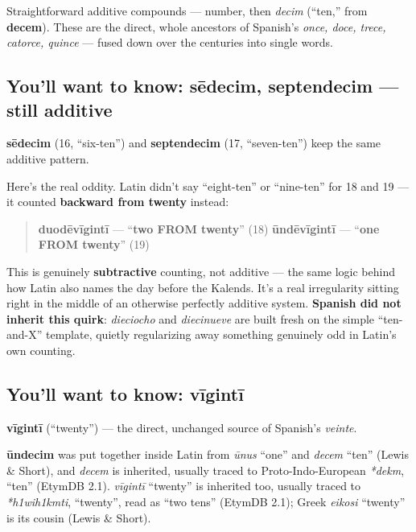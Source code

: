 Straightforward additive compounds — number, then \emph{decim} (\textquotedblleft{}ten,\textquotedblright{} from \textbf{decem}). These are the direct, whole ancestors of Spanish's \emph{once, doce, trece, catorce, quince} — fused down over the centuries into single words.

\subsection*{You'll want to know: sēdecim, septendecim — still additive}
\textbf{sēdecim} (16, \textquotedblleft{}six-ten\textquotedblright{}) and \textbf{septendecim} (17, \textquotedblleft{}seven-ten\textquotedblright{}) keep the same additive pattern.

\begin{culture}
Here's the real oddity. Latin didn't say \textquotedblleft{}eight-ten\textquotedblright{} or \textquotedblleft{}nine-ten\textquotedblright{} for 18 and 19 — it counted \textbf{backward from twenty} instead:

\begin{quote}
\textbf{duodēvīgintī} — \textquotedblleft{}\textbf{two FROM twenty}\textquotedblright{} (18) \textbf{ūndēvīgintī} — \textquotedblleft{}\textbf{one FROM twenty}\textquotedblright{} (19)
\end{quote}

This is genuinely \textbf{subtractive} counting, not additive — the same logic behind how Latin also names the day before the Kalends. It's a real irregularity sitting right in the middle of an otherwise perfectly additive system. \textbf{Spanish did not inherit this quirk}: \emph{dieciocho} and \emph{diecinueve} are built fresh on the simple \textquotedblleft{}ten-and-X\textquotedblright{} template, quietly regularizing away something genuinely odd in Latin's own counting.
\end{culture}

\subsection*{You'll want to know: vīgintī}
\textbf{vīgintī} (\textquotedblleft{}twenty\textquotedblright{}) — the direct, unchanged source of Spanish's \emph{veinte}.

\begin{cousinweb}
\textbf{ūndecim} was put together inside Latin from \emph{ūnus} \textquotedblleft{}one\textquotedblright{} and \emph{decem} \textquotedblleft{}ten\textquotedblright{} (Lewis \& Short), and \emph{decem} is inherited, usually traced to Proto-Indo-European \emph{*dekm}, \textquotedblleft{}ten\textquotedblright{} (EtymDB 2.1). \emph{vīgintī} \textquotedblleft{}twenty\textquotedblright{} is inherited too, usually traced to \emph{*h1wih1kmti}, \textquotedblleft{}twenty\textquotedblright{}, read as \textquotedblleft{}two tens\textquotedblright{} (EtymDB 2.1); Greek \emph{eikosi} \textquotedblleft{}twenty\textquotedblright{} is its cousin (Lewis \& Short).
\end{cousinweb}

